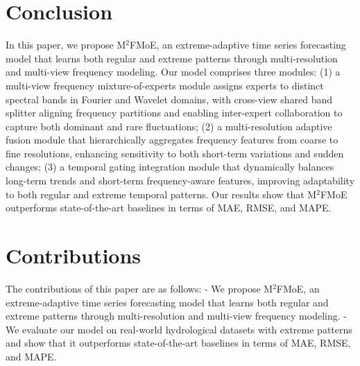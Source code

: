 \documentclass{article}
\begin{document}
\section{Conclusion}
In this paper, we propose M$^2$FMoE, an extreme-adaptive time series forecasting model that learns both regular and extreme patterns through multi-resolution and multi-view frequency modeling. Our model comprises three modules: (1) a multi-view frequency mixture-of-experts module assigns experts to distinct spectral bands in Fourier and Wavelet domains, with cross-view shared band splitter aligning frequency partitions and enabling inter-expert collaboration to capture both dominant and rare fluctuations; (2) a multi-resolution adaptive fusion module that hierarchically aggregates frequency features from coarse to fine resolutions, enhancing sensitivity to both short-term variations and sudden changes; (3) a temporal gating integration module that dynamically balances long-term trends and short-term frequency-aware features, improving adaptability to both regular and extreme temporal patterns. Our results show that M$^2$FMoE outperforms state-of-the-art baselines in terms of MAE, RMSE, and MAPE.

\section{Contributions}
The contributions of this paper are as follows:
- We propose M$^2$FMoE, an extreme-adaptive time series forecasting model that learns both regular and extreme patterns through multi-resolution and multi-view frequency modeling.
- We evaluate our model on real-world hydrological datasets with extreme patterns and show that it outperforms state-of-the-art baselines in terms of MAE, RMSE, and MAPE.
\end{document}
